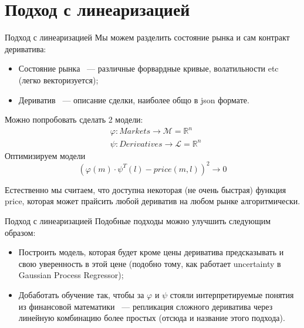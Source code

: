 \documentclass[10pt]{beamer}
\newcommand{\R}{\ensuremath{\mathbb{R}}}
\renewcommand{\phi}{\varphi}
\begin{document}
    \section{Подход с линеаризацией}
    \begin{frame}{Подход с линеаризацией}
        Мы можем разделить состояние рынка и сам контракт дериватива:
        \begin{itemize}
            \item Состояние рынка ~--- различные форвардные кривые, волатильности etc (легко векторизуется);
            \item Дериватив ~--- описание сделки, наиболее общо в json формате.
        \end{itemize}

        Можно попробовать сделать 2 модели:
        \begin{align*}
            & \phi: Markets \to \mathcal{M} = \R^n \\
            & \psi: Derivatives \to \mathcal{L} = \R^n
        \end{align*}
        Оптимизируем модели 
        \[
            \left( \phi(m) \cdot \psi^T(l) - price(m, l) \right)^2 \to 0
        \]

        \begin{remark}
            Естественно мы считаем, что доступна некоторая (не очень быстрая) функция price, которая может прайсить любой дериватив на любом рынке алгоритмически.
        \end{remark}
    \end{frame}

    \begin{frame}{Подход с линеаризацией}
        Подобные подходы можно улучшить следующим образом:
        \begin{itemize}
            \item Построить модель, которая будет кроме цены дериватива предсказывать и свою уверенность в этой цене 
            (подобно тому, как работает uncertainty в Gaussian Process Regressor);
            \item Добаботать обучение так, чтобы за $\phi$ и $\psi$ стояли интерпретируемые понятия из финансовой математики ~--- репликация сложного дериватива через линейную комбинацию более простых (отсюда и название этого подхода).
        \end{itemize}
        
    \end{frame}
\end{document}
